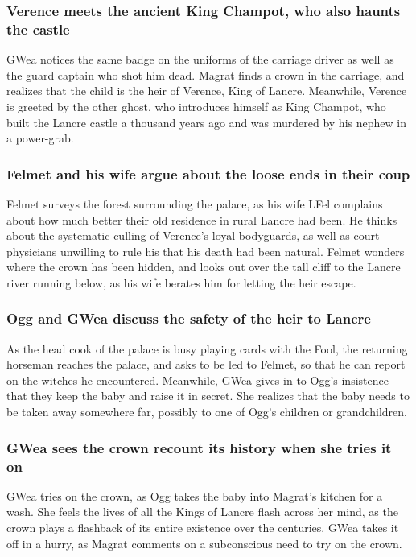 \subsubsection{\Gls{Verence} meets the ancient King \Gls{Champot}, who also haunts the castle}
\Gls{GWea} notices the same badge on the uniforms of the carriage driver as well as the guard
captain who shot him dead. \Gls{Magrat} finds a crown in the carriage, and realizes that the child
is the heir of \Gls{Verence}, King of Lancre. Meanwhile, \Gls{Verence} is greeted by the other
ghost, who introduces himself as King \Gls{Champot}, who built the Lancre castle a thousand years
ago and was murdered by his nephew in a power-grab.

\subsubsection{\Gls{Felmet} and his wife argue about the loose ends in their coup}
\Gls{Felmet} surveys the forest surrounding the palace, as his wife \Gls{LFel} complains about how
much better their old residence in rural Lancre had been. He thinks about the systematic culling of
\Gls{Verence}'s loyal bodyguards, as well as court physicians unwilling to rule his that his death
had been natural. \Gls{Felmet} wonders where the crown has been hidden, and looks out over the
tall cliff to the Lancre river running below, as his wife berates him for letting the heir escape.

\subsubsection{\Gls{Ogg} and \Gls{GWea} discuss the safety of the heir to Lancre}
As the head cook of the palace is busy playing cards with the \Gls{Fool}, the returning horseman
reaches the palace, and asks to be led to \Gls{Felmet}, so that he can report on the witches he
encountered. Meanwhile, \Gls{GWea} gives in to \Gls{Ogg}'s insistence that they keep the baby and
raise it in secret. She realizes that the baby needs to be taken away somewhere far, possibly to
one of \Gls{Ogg}'s children or grandchildren.

\subsubsection{\Gls{GWea} sees the crown recount its history when she tries it on}
\Gls{GWea} tries on the crown, as \Gls{Ogg} takes the baby into \Gls{Magrat}'s kitchen for a wash.
She feels the lives of all the Kings of Lancre flash across her mind, as the crown plays a flashback
of its entire existence over the centuries. \Gls{GWea} takes it off in a hurry, as \Gls{Magrat}
comments on a subconscious need to try on the crown.

